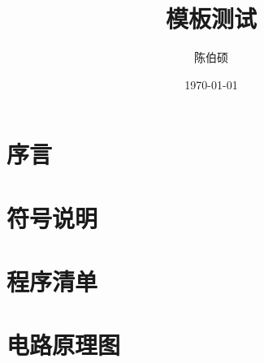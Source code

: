 \documentclass[draft]{XaufeThesisTemplate}
\title{模板测试}
\author{陈伯硕}
\date{\today}
\begin{document}





\listoftodos


% 

\setcounter{tocdepth}{3}
\tableofcontents
\newpage

\setcounter{page}{1}

\ifdraft{
	
}{}
\section{序言}
	
\section{符号说明}
	

\ifdraft{
	
}{}
\pagebreak

\nocite{*}

\pagebreak
\begin{appendices} %
	\ifdraft{
		
	}{}
  \section{程序清单}
  \section{电路原理图}
\end{appendices}

\pagebreak
\thanksSection
	
\end{document}
